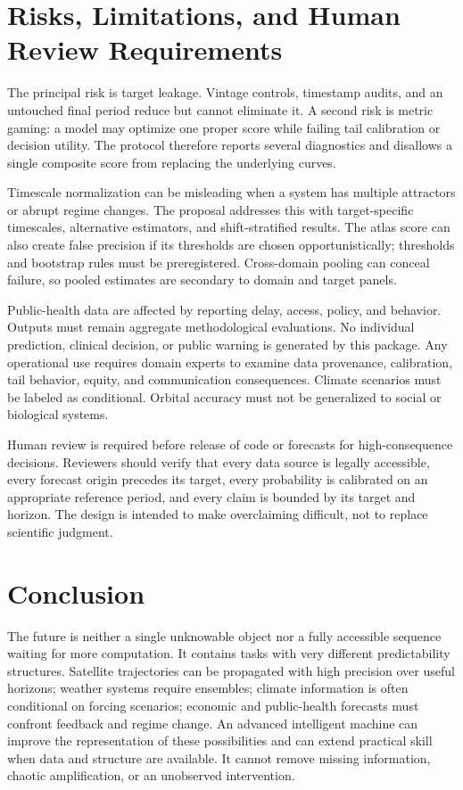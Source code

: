 \documentclass[conference]{IEEEtran}
\begin{document}
\section{Risks, Limitations, and Human Review Requirements}
The principal risk is target leakage. Vintage controls, timestamp audits, and an untouched final period reduce but cannot eliminate it. A second risk is metric gaming: a model may optimize one proper score while failing tail calibration or decision utility. The protocol therefore reports several diagnostics and disallows a single composite score from replacing the underlying curves.

Timescale normalization can be misleading when a system has multiple attractors or abrupt regime changes. The proposal addresses this with target-specific timescales, alternative estimators, and shift-stratified results. The atlas score can also create false precision if its thresholds are chosen opportunistically; thresholds and bootstrap rules must be preregistered. Cross-domain pooling can conceal failure, so pooled estimates are secondary to domain and target panels.

Public-health data are affected by reporting delay, access, policy, and behavior. Outputs must remain aggregate methodological evaluations. No individual prediction, clinical decision, or public warning is generated by this package. Any operational use requires domain experts to examine data provenance, calibration, tail behavior, equity, and communication consequences. Climate scenarios must be labeled as conditional. Orbital accuracy must not be generalized to social or biological systems.

Human review is required before release of code or forecasts for high-consequence decisions. Reviewers should verify that every data source is legally accessible, every forecast origin precedes its target, every probability is calibrated on an appropriate reference period, and every claim is bounded by its target and horizon. The design is intended to make overclaiming difficult, not to replace scientific judgment.

\section{Conclusion}
The future is neither a single unknowable object nor a fully accessible sequence waiting for more computation. It contains tasks with very different predictability structures. Satellite trajectories can be propagated with high precision over useful horizons; weather systems require ensembles; climate information is often conditional on forcing scenarios; economic and public-health forecasts must confront feedback and regime change. An advanced intelligent machine can improve the representation of these possibilities and can extend practical skill when data and structure are available. It cannot remove missing information, chaotic amplification, or an unobserved intervention.
\end{document}
